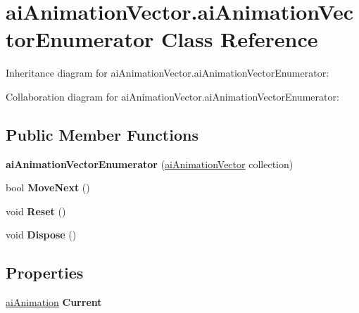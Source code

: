 \hypertarget{classai_animation_vector_1_1ai_animation_vector_enumerator}{\section{ai\+Animation\+Vector.\+ai\+Animation\+Vector\+Enumerator Class Reference}
\label{classai_animation_vector_1_1ai_animation_vector_enumerator}
}


Inheritance diagram for ai\+Animation\+Vector.\+ai\+Animation\+Vector\+Enumerator\+:


Collaboration diagram for ai\+Animation\+Vector.\+ai\+Animation\+Vector\+Enumerator\+:
\subsection*{Public Member Functions}
\begin{DoxyCompactItemize}
\item 
\hypertarget{classai_animation_vector_1_1ai_animation_vector_enumerator_a1e5f3d5b0defe57ed76a6c5e4f8158b9}{{\bfseries ai\+Animation\+Vector\+Enumerator} (\hyperlink{classai_animation_vector}{ai\+Animation\+Vector} collection)}\label{classai_animation_vector_1_1ai_animation_vector_enumerator_a1e5f3d5b0defe57ed76a6c5e4f8158b9}

\item 
\hypertarget{classai_animation_vector_1_1ai_animation_vector_enumerator_abf84e6334ac5dd513ab392d8561452c1}{bool {\bfseries Move\+Next} ()}\label{classai_animation_vector_1_1ai_animation_vector_enumerator_abf84e6334ac5dd513ab392d8561452c1}

\item 
\hypertarget{classai_animation_vector_1_1ai_animation_vector_enumerator_a0b76a42cc777e1dfc3b78a99b5183804}{void {\bfseries Reset} ()}\label{classai_animation_vector_1_1ai_animation_vector_enumerator_a0b76a42cc777e1dfc3b78a99b5183804}

\item 
\hypertarget{classai_animation_vector_1_1ai_animation_vector_enumerator_a273ec89d897e1747170fd157d030dbea}{void {\bfseries Dispose} ()}\label{classai_animation_vector_1_1ai_animation_vector_enumerator_a273ec89d897e1747170fd157d030dbea}

\end{DoxyCompactItemize}
\subsection*{Properties}
\begin{DoxyCompactItemize}
\item 
\hypertarget{classai_animation_vector_1_1ai_animation_vector_enumerator_a096841ff6d441f035fe164080e833018}{\hyperlink{structai_animation}{ai\+Animation} {\bfseries Current}}\label{classai_animation_vector_1_1ai_animation_vector_enumerator_a096841ff6d441f035fe164080e833018}

\end{DoxyCompactItemize}


